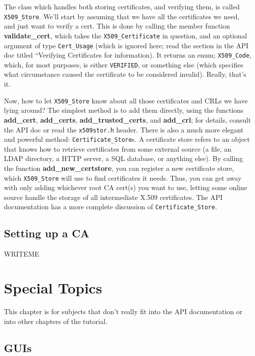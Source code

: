\documentclass{article}
\newcommand{\filename}[1]{\texttt{#1}}
\newcommand{\function}[1]{\textbf{#1}}
\newcommand{\type}[1]{\texttt{#1}}
\begin{document}
The class which handles both storing certificates, and verifying them, is
called \type{X509\_Store}. We'll start by assuming that we have all the
certificates we need, and just want to verify a cert. This is done by calling
the member function \function{validate\_cert}, which takes the
\type{X509\_Certificate} in question, and an optional argument of type
\type{Cert\_Usage} (which is ignored here; read the section in the API doc
titled ``Verifying Certificates for information). It returns an enum;
\type{X509\_Code}, which, for most purposes, is either \type{VERIFIED}, or
something else (which specifies what circumstance caused the certificate to be
considered invalid). Really, that's it.

Now, how to let \type{X509\_Store} know about all those certificates and CRLs
we have lying around? The simplest method is to add them directly, using the
functions \function{add\_cert}, \function{add\_certs},
\function{add\_trusted\_certs}, and \function{add\_crl}; for details, consult
the API doc or read the \filename{x509stor.h} header. There is also a much more
elegant and powerful method: \type{Certificate\_Store}s. A certificate store
refers to an object that knows how to retrieve certificates from some external
source (a file, an LDAP directory, a HTTP server, a SQL database, or anything
else). By calling the function \function{add\_new\_certstore}, you can register
a new certificate store, which \type{X509\_Store} will use to find certificates
it needs. Thus, you can get away with only adding whichever root CA cert(s) you
want to use, letting some online source handle the storage of all intermediate
X.509 certificates. The API documentation has a more complete discussion of
\type{Certificate\_Store}.

\subsection{Setting up a CA}

WRITEME

\pagebreak

\section{Special Topics}

This chapter is for subjects that don't really fit into the API documentation
or into other chapters of the tutorial.

\subsection{GUIs}
\end{document}
